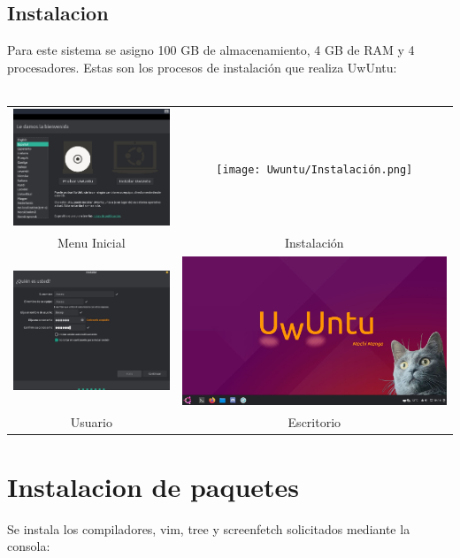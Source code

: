 \documentclass{article}
\begin{document}
    \subsection{Instalacion}
    Para este sistema se asigno 100 GB de almacenamiento, 4 GB de RAM y 4 procesadores. Estas son los procesos de instalación que realiza UwUntu:
    \\
    \\
    \begin{tabular}{cc}
        \includegraphics[width=.5\linewidth,valign=m]{Uwuntu/Menu inicial.png} & \texttt{[image: Uwuntu/Instalación.png]} \\
        Menu Inicial & Instalación \\
        \includegraphics[width=.5\linewidth,valign=m]{Uwuntu/Usuario.png} & \includegraphics[width=.5\linewidth,valign=m]{Uwuntu/Escritorio.png} \\
        Usuario & Escritorio \\
    \end{tabular}
\newpage
    \section{Instalacion de paquetes}
Se instala los compiladores, vim, tree y screenfetch solicitados mediante la consola:
    
\end{document}
